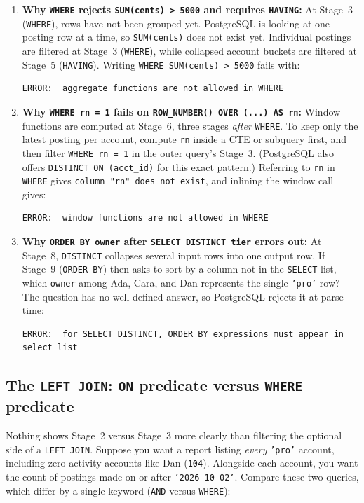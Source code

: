 \begin{enumerate}
  \item \textbf{Why \texttt{WHERE} rejects \texttt{SUM(cents) > 5000} and requires \texttt{HAVING}:} At Stage~3 (\texttt{WHERE}), rows have not been grouped yet. PostgreSQL is looking at one posting row at a time, so \texttt{SUM(cents)} does not exist yet. Individual postings are filtered at Stage~3 (\texttt{WHERE}), while collapsed account buckets are filtered at Stage~5 (\texttt{HAVING}). Writing \texttt{WHERE SUM(cents) > 5000} fails with:
\begin{lstlisting}[language=Plain]
ERROR:  aggregate functions are not allowed in WHERE
\end{lstlisting}
  \item \textbf{Why \texttt{WHERE rn = 1} fails on \texttt{ROW\_NUMBER() OVER (...) AS rn}:} Window functions are computed at Stage~6, three stages \emph{after} \texttt{WHERE}. To keep only the latest posting per account, compute \texttt{rn} inside a CTE or subquery first, and then filter \texttt{WHERE rn = 1} in the outer query's Stage~3. (PostgreSQL also offers \texttt{DISTINCT ON (acct\_id)} for this exact pattern.) Referring to \texttt{rn} in \texttt{WHERE} gives \texttt{column "rn" does not exist}, and inlining the window call gives:
\begin{lstlisting}[language=Plain]
ERROR:  window functions are not allowed in WHERE
\end{lstlisting}
  \item \textbf{Why \texttt{ORDER BY owner} after \texttt{SELECT DISTINCT tier} errors out:} At Stage~8, \texttt{DISTINCT} collapses several input rows into one output row. If Stage~9 (\texttt{ORDER BY}) then asks to sort by a column not in the \texttt{SELECT} list, which \texttt{owner} among Ada, Cara, and Dan represents the single \texttt{'pro'} row? The question has no well-defined answer, so PostgreSQL rejects it at parse time:
\begin{lstlisting}[language=Plain]
ERROR:  for SELECT DISTINCT, ORDER BY expressions must appear in select list
\end{lstlisting}
\end{enumerate}

\subsection{The \texttt{LEFT JOIN}: \texttt{ON} predicate versus \texttt{WHERE} predicate}

Nothing shows Stage~2 versus Stage~3 more clearly than filtering the optional side of a \texttt{LEFT JOIN}. Suppose you want a report listing \emph{every} \texttt{'pro'} account, including zero-activity accounts like Dan (\texttt{104}). Alongside each account, you want the count of postings made on or after \texttt{'2026-10-02'}. Compare these two queries, which differ by a single keyword (\texttt{AND} versus \texttt{WHERE}):

